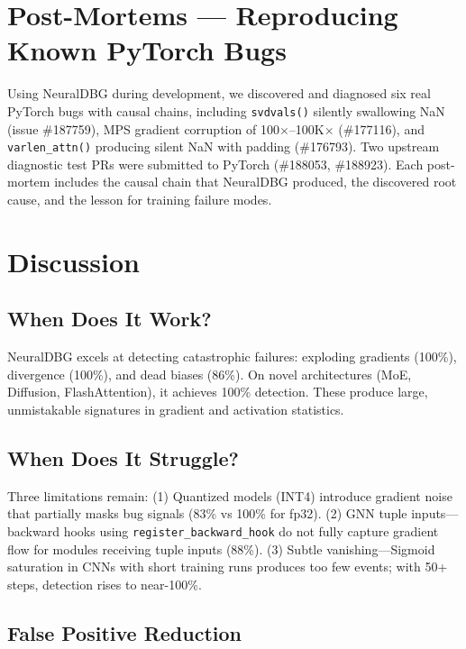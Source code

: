 \documentclass[11pt]{article}
\begin{document}
\section{Post-Mortems — Reproducing Known PyTorch Bugs}

Using NeuralDBG during development, we discovered and diagnosed six real PyTorch bugs with causal chains, including \texttt{svdvals()} silently swallowing NaN (issue \#187759), MPS gradient corruption of 100$\times$--100K$\times$ (\#177116), and \texttt{varlen\_attn()} producing silent NaN with padding (\#176793). Two upstream diagnostic test PRs were submitted to PyTorch (\#188053, \#188923). Each post-mortem includes the causal chain that NeuralDBG produced, the discovered root cause, and the lesson for training failure modes.


\section{Discussion}

\subsection{When Does It Work?}

NeuralDBG excels at detecting catastrophic failures: exploding gradients (100\%), divergence (100\%), and dead biases (86\%). On novel architectures (MoE, Diffusion, FlashAttention), it achieves 100\% detection. These produce large, unmistakable signatures in gradient and activation statistics.

\subsection{When Does It Struggle?}

Three limitations remain: (1) Quantized models (INT4) introduce gradient noise that partially masks bug signals (83\% vs 100\% for fp32). (2) GNN tuple inputs—backward hooks using \texttt{register\_backward\_hook} do not fully capture gradient flow for modules receiving tuple inputs (88\%). (3) Subtle vanishing—Sigmoid saturation in CNNs with short training runs produces too few events; with 50+ steps, detection rises to near-100\%.

\subsection{False Positive Reduction}
\end{document}
